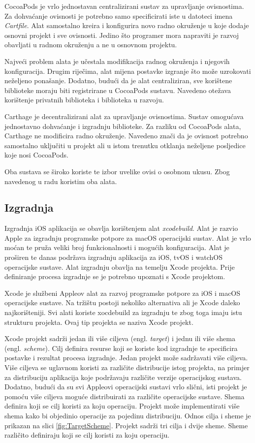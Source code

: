 \documentclass[times, utf8, diplomski, numeric]{fer}
\newcommand{\eng}[1]{(engl. \textit{#1})}
\begin{document}
CocoaPods je vrlo jednostavan centralizirani sustav za upravljanje ovisnostima. Za dohvaćanje ovisnosti je potrebno samo specificirati iste u datoteci imena \textit{Cartfile}. Alat samostalno kreira i konfigurira novo radno okruženje u koje dodaje osnovni projekt i sve ovisnosti. Jedino što programer mora napraviti je razvoj obavljati u radnom okruženju a ne u osnovnom projektu.

Najveći problem alata je učestala modifikacija radnog okruženja i njegovih konfiguracija. Drugim riječima, alat mijena postavke izgranje što može uzrokovati neželjeno ponašanje. Dodatno, budući da je alat centraliziran, sve korištene biblioteke moraju biti registrirane u CocoaPods sustavu. Navedeno otežava korištenje privatnih biblioteka i biblioteka u razvoju.

Carthage je decentralizirani alat za upravljanje ovisnostima. Sustav omogućava jednostavno dohvaćanje i izgradnju biblioteke. Za razliku od CocoaPods alata, Carthage ne modificira radno okruženje. Navedeno znači da je ovisnost potrebno samostalno uključiti u projekt ali u istom trenutku otklanja neželjene posljedice koje nosi CocoaPods.

Oba sustava se široko koriste te izbor uvelike ovisi o osobnom ukusu. Zbog navedenog u radu koristim oba alata.

\subsection{Izgradnja}

Izgradnja iOS aplikacija se obavlja korištenjem alat \textit{xcodebuild}\citep{xcodebuild}. Alat je razvio Apple za izgradnju programske potpore za macOS operacijski sustav. Alat je vrlo moćan te pruža veliki broj funkcionalnosti i mogućih konfiguracija. Alat je proširen te danas podržava izgradnju aplikacija za iOS, tvOS i watchOS operacijske sustave. Alat izgradnju obavlja na temelju Xcode projekta. Prije definiranje procesa izgradnje se je potrebno upoznati s Xcode projektom.

Xcode je službeni Appleov alat za razvoj programske potpore za iOS i macOS operacijske sustave. Na tržištu postoji nekoliko alternativa ali je Xcode daleko najkorišteniji. Svi alati koriste xocdebuild za izgradnju te zbog toga imaju istu strukturu projekta. Ovaj tip projekta se naziva Xcode projekt.

Xcode projekt sadrži jedan ili više ciljeva \eng{target} i jednu ili više shema \eng{scheme}. Cilj definira resurse koji se koriste kod izgradnje te specificira postavke i rezultat procesa izgradnje. Jedan projekt može sadržavati više ciljeva. Više ciljeva se uglavnom koristi za različite distribucije istog projekta, na primjer za distribuciju aplikacija koje podržavaju različite verzije operacijskog sustava. Dodatno, budući da su svi Appleovi operacijski sustavi vrlo slični, isti projekt je pomoću više ciljeva moguće distribuirati za različite operacijske sustave. Shema definira koji se cilj koristi za koju operaciju. Projekt može implementirati više shema kako bi objedinio operacije za pojedinu distribuciju. Odnos cilja i sheme je prikazan na slici \ref{fig:TargetScheme}. Projekt sadrži tri cilja i dvije sheme. Sheme različito definiraju koji se cilj koristi za koju operaciju.
\end{document}
